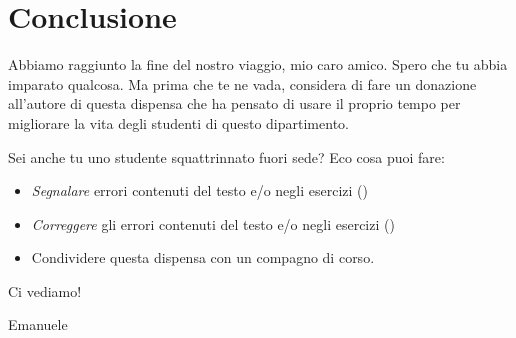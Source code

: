 \section*{Conclusione}

Abbiamo raggiunto la fine del nostro viaggio, mio caro amico. Spero che tu abbia imparato qualcosa. Ma prima che te ne vada, considera di fare un donazione all'autore di questa dispensa che ha pensato di usare il proprio tempo per migliorare la vita degli studenti di questo dipartimento.

Sei anche tu uno studente squattrinnato fuori sede? Eco cosa puoi fare:

\begin{itemize}
	\item \emph{Segnalare} errori contenuti del testo e/o negli esercizi ()
	\item \emph{Correggere} gli errori contenuti del testo e/o negli esercizi ()
	\item Condividere questa dispensa con un compagno di corso.
\end{itemize}

Ci vediamo!

Emanuele
